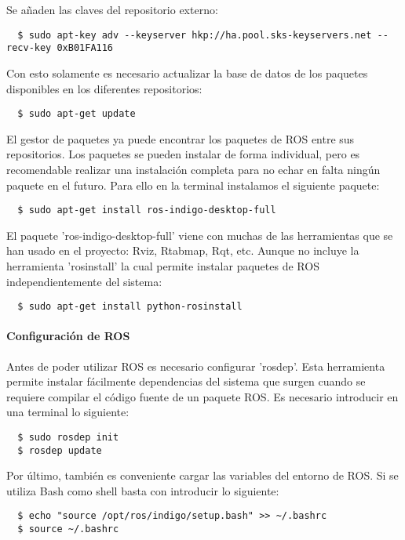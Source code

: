 Se añaden las claves del repositorio externo:
\\
\begin{lstlisting}
  $ sudo apt-key adv --keyserver hkp://ha.pool.sks-keyservers.net --recv-key 0xB01FA116
\end{lstlisting}

Con esto solamente es necesario actualizar la base de datos de los paquetes
disponibles en los diferentes repositorios:
\\
\begin{lstlisting}
  $ sudo apt-get update
\end{lstlisting}

El gestor de paquetes ya puede encontrar los paquetes de ROS entre sus
repositorios. Los paquetes se pueden instalar de forma individual, pero es
recomendable realizar una instalación completa para no echar en falta ningún
paquete en el futuro. Para ello en la terminal instalamos el siguiente paquete:
\\
\begin{lstlisting}
  $ sudo apt-get install ros-indigo-desktop-full
\end{lstlisting}

El paquete 'ros-indigo-desktop-full' viene con muchas de las herramientas que se
han usado en el proyecto: Rviz, Rtabmap, Rqt, etc. Aunque no incluye la
herramienta 'rosinstall' la cual permite instalar paquetes de ROS
independientemente del sistema:
\\
\begin{lstlisting}
  $ sudo apt-get install python-rosinstall
\end{lstlisting}

\paragraph{Configuración de ROS} \hspace{0pt}

Antes de poder utilizar ROS es necesario configurar 'rosdep'. Esta herramienta
permite instalar fácilmente dependencias del sistema que surgen cuando se
requiere compilar el código fuente de un paquete ROS. Es necesario introducir en
una terminal lo siguiente:
\\
\begin{lstlisting}
  $ sudo rosdep init
  $ rosdep update
\end{lstlisting}

Por último, también es conveniente cargar las variables del entorno de ROS. Si
se utiliza Bash como shell basta con introducir lo siguiente:
\\
\begin{lstlisting}
  $ echo "source /opt/ros/indigo/setup.bash" >> ~/.bashrc
  $ source ~/.bashrc
\end{lstlisting}

